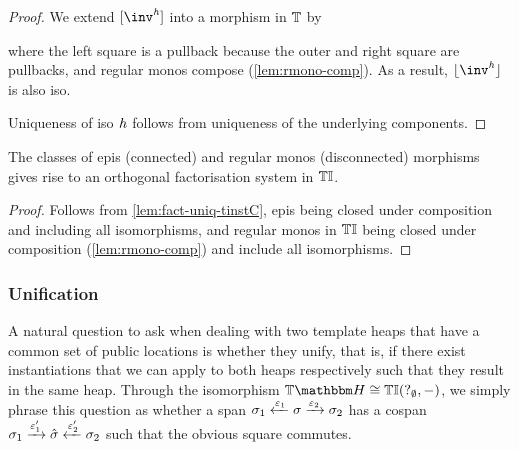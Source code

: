 \begin{proof}
    We extend $\anyL{\inv^\vh}$ into a morphism in $\mathbb{T}$ by
    \begin{center}
    \end{center}
    where the left square is a pullback because the outer and right square are pullbacks, and regular monos compose (\cref{lem:rmono-comp}).
    As a result, $\concL{\inv^\vh}$ is also iso.
    
    Uniqueness of iso $\mathit{h}$ follows from uniqueness of the underlying components.  
\end{proof}

\begin{lemma}\label{lem:ofs-tinstC}
    The classes of epis (connected) and regular monos (disconnected) morphisms gives rise to an orthogonal factorisation system in ${\mathbb{T}\mathbb{I}}$.
\end{lemma}
\begin{proof}
    Follows from \cref{lem:fact-uniq-tinstC}, 
    epis being closed under composition and including all isomorphisms,
    and regular monos in ${\mathbb{T}\mathbb{I}}$ being closed under composition (\cref{lem:rmono-comp}) and include all isomorphisms.
\end{proof}
 
\subsubsection{Unification}
\label{sec:unification-theaps}

A natural question to ask when dealing with two template heaps that have a common set of public locations is whether they unify,
that is, if there exist instantiations that we can apply to both heaps respectively such that they result in the same heap.
Through the isomorphism $\theapF \iso \homF\tinstC{?_\emptyset}\dash$, we simply phrase this question as whether  
a span $\sigma_1 \xleftarrow{\varepsilon_1} \sigma \xrightarrow{\varepsilon_2} \sigma_2$ has a cospan $\sigma_1 \xrightarrow{\varepsilon_1'} \hat\sigma \xleftarrow{\varepsilon_2'} \sigma_2$ such that
the obvious square commutes.

